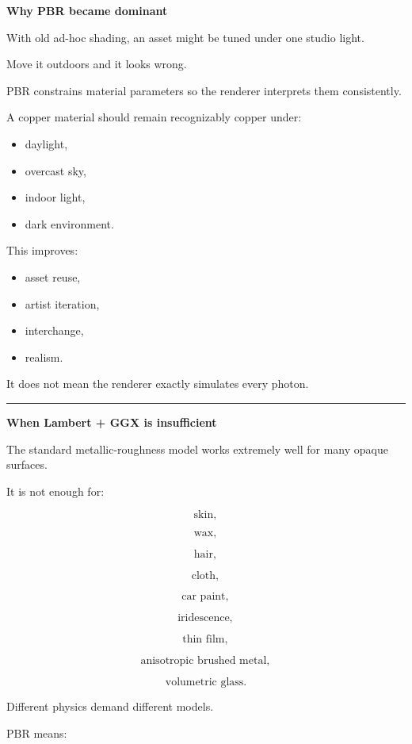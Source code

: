 \textbf{Why PBR became dominant}

With old ad-hoc shading, an asset might be tuned under one studio light.

Move it outdoors and it looks wrong.

PBR constrains material parameters so the renderer interprets them consistently.

A copper material should remain recognizably copper under:

\begin{itemize}
\tightlist
\item
  daylight,
\item
  overcast sky,
\item
  indoor light,
\item
  dark environment.
\end{itemize}

This improves:

\begin{itemize}
\tightlist
\item
  asset reuse,
\item
  artist iteration,
\item
  interchange,
\item
  realism.
\end{itemize}

It does not mean the renderer exactly simulates every photon.

\begin{center}\rule{0.5\linewidth}{0.5pt}\end{center}

\textbf{When Lambert + GGX is insufficient}

The standard metallic-roughness model works extremely well for many opaque surfaces.

It is not enough for:

\[
\text{skin},
\]

\[
\text{wax},
\]

\[
\text{hair},
\]

\[
\text{cloth},
\]

\[
\text{car paint},
\]

\[
\text{iridescence},
\]

\[
\text{thin film},
\]

\[
\text{anisotropic brushed metal},
\]

\[
\text{volumetric glass}.
\]

Different physics demand different models.

PBR means:

